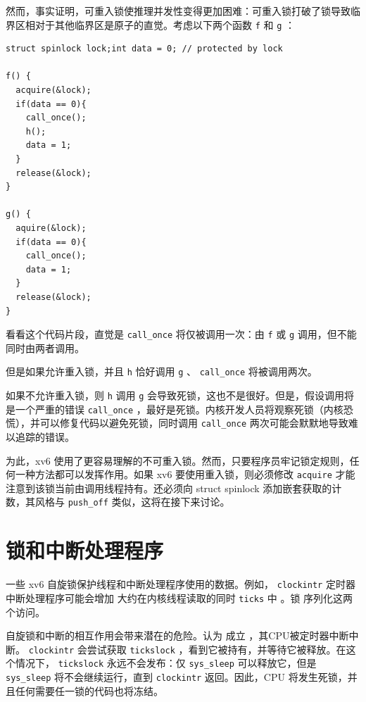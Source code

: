 \documentclass[UTF8]{article}
\begin{document}
然而，事实证明，可重入锁使推理并发性变得更加困难：可重入锁打破了锁导致临界区相对于其他临界区是原子的直觉。考虑以下两个函数    \lstinline{f}    和
    \lstinline{g}   ：  

   \begin{lstlisting}struct spinlock lock;int data = 0; // protected by lock

f() {
  acquire(&lock);
  if(data == 0){
    call_once();
    h();
    data = 1;
  }
  release(&lock);
}

g() {
  aquire(&lock);
  if(data == 0){
    call_once();
    data = 1;
  }
  release(&lock);
}
\end{lstlisting}     

看看这个代码片段，直觉是
    \lstinline{call_once}    将仅被调用一次：由    \lstinline{f}    或    \lstinline{g}    调用，但不能同时由两者调用。  

但是如果允许重入锁，并且    \lstinline{h}    恰好调用
    \lstinline{g}   、   \lstinline{call_once}   将被调用两次。  

如果不允许重入锁，则    \lstinline{h}    调用
    \lstinline{g}    会导致死锁，这也不是很好。但是，假设调用将是一个严重的错误
    \lstinline{call_once}    ，最好是死锁。内核开发人员将观察死锁（内核恐慌），并可以修复代码以避免死锁，同时调用
    \lstinline{call_once}    两次可能会默默地导致难以追踪的错误。  

为此，xv6 使用了更容易理解的不可重入锁。然而，只要程序员牢记锁定规则，任何一种方法都可以发挥作用。如果 xv6 要使用重入锁，则必须修改    \lstinline{acquire}    才能注意到该锁当前由调用线程持有。还必须向 struct spinlock 添加嵌套获取的计数，其风格与    \lstinline{push_off}    类似，这将在接下来讨论。  

   \section{锁和中断处理程序  }   
    \label{s:lockinter}    一些 xv6 自旋锁保护线程和中断处理程序使用的数据。例如，
    \lstinline{clockintr}    定时器中断处理程序可能会增加
        大约在内核线程读取的同时
    \lstinline{ticks}    中
       。锁
        序列化这两个访问。  

自旋锁和中断的相互作用会带来潜在的危险。认为
        成立
       ，其CPU被定时器中断中断。
    \lstinline{clockintr}    会尝试获取
    \lstinline{tickslock}    ，看到它被持有，并等待它被释放。在这个情况下，
    \lstinline{tickslock}    永远不会发布：仅
    \lstinline{sys_sleep}   可以释放它，但是
    \lstinline{sys_sleep}    将不会继续运行，直到
    \lstinline{clockintr}    返回。因此，CPU 将发生死锁，并且任何需要任一锁的代码也将冻结。  
\end{document}
